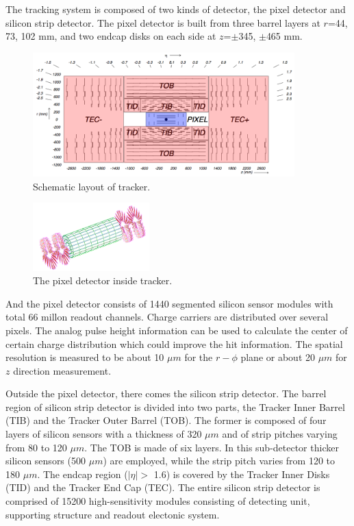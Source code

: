 The tracking system is composed of two kinds of detector, the pixel detector and silicon strip detector. The pixel detector is built from three barrel layers at $r$=44, 73, 102 mm, and two endcap disks on each side at $z$=$\pm$345, $\pm$465 mm.
\begin{figure}[hbtp]
  \begin{center}
    \includegraphics[width=0.9\textwidth]{figure/CH2/tracker.png}
  \end{center}
  \caption{\label{fig:tracker}Schematic layout of tracker.}
\end{figure}
\begin{figure}[hbtp]
  \begin{center}
    \includegraphics[width=0.4\textwidth]{figure/CH2/pixel.png}
  \end{center}
  \caption{\label{fig:pixel}The pixel detector inside tracker.}
\end{figure}
\newline And the pixel detector consists of 1440 segmented silicon sensor modules with total 66 millon readout channels. Charge carriers are distributed over several pixels. The analog pulse height information can be used to calculate the center of certain charge distribution which could improve the hit information. The spatial resolution is measured to be about 10 $\mu m$ for the $r-\phi$ plane or about 20 $\mu m$ for $z$ direction measurement.

Outside the pixel detector, there comes the silicon strip detector. The barrel region of silicon strip detector is divided into two parts, the Tracker Inner Barrel (TIB) and the Tracker Outer Barrel (TOB). The former is composed of four layers of silicon sensors with a thickness of 320 $\mu m$ and of strip pitches varying from 80 to 120 $\mu m$. The TOB is made of six layers. In this sub-detector thicker silicon sensors (500 $\mu m$) are employed, while the strip pitch varies from 120 to 180 $\mu m$. The endcap region ($|\eta| >$ 1.6) is covered by the Tracker Inner Disks (TID) and the Tracker End Cap (TEC). The entire silicon strip detector is comprised of 15200 high-sensitivity modules consisting of detecting unit, supporting structure and readout electonic system.


